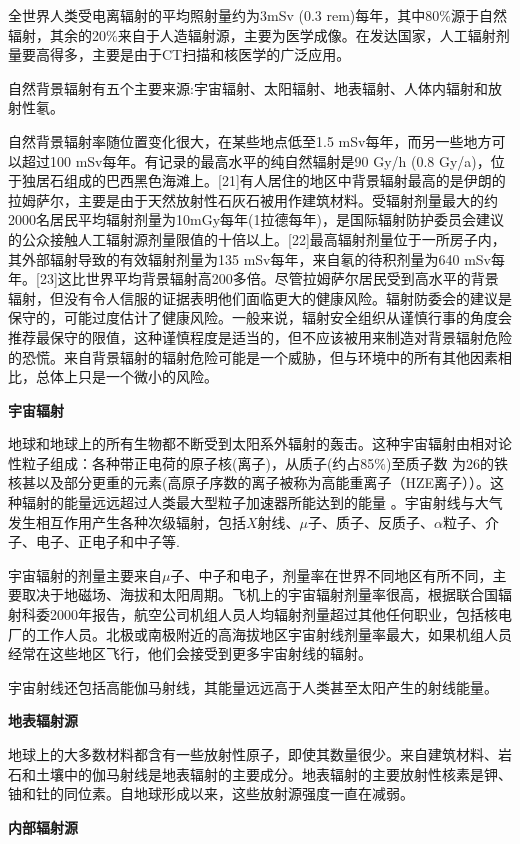 全世界人类受电离辐射的平均照射量约为3mSv (0.3 rem)每年，其中80\%源于自然辐射，其余的20\%来自于人造辐射源，主要为医学成像。在发达国家，人工辐射剂量要高得多，主要是由于CT扫描和核医学的广泛应用。

自然背景辐射有五个主要来源:宇宙辐射、太阳辐射、地表辐射、人体内辐射和放射性氡。

自然背景辐射率随位置变化很大，在某些地点低至1.5 mSv每年，而另一些地方可以超过100 mSv每年。有记录的最高水平的纯自然辐射是90 Gy/h (0.8 Gy/a)，位于独居石组成的巴西黑色海滩上。[21]有人居住的地区中背景辐射最高的是伊朗的拉姆萨尔，主要是由于天然放射性石灰石被用作建筑材料。受辐射剂量最大的约2000名居民平均辐射剂量为10mGy每年(1拉德每年)，是国际辐射防护委员会建议的公众接触人工辐射源剂量限值的十倍以上。[22]最高辐射剂量位于一所房子内，其外部辐射导致的有效辐射剂量为135 mSv每年，来自氡的待积剂量为640 mSv每年。[23]这比世界平均背景辐射高200多倍。尽管拉姆萨尔居民受到高水平的背景辐射，但没有令人信服的证据表明他们面临更大的健康风险。辐射防委会的建议是保守的，可能过度估计了健康风险。一般来说，辐射安全组织从谨慎行事的角度会推荐最保守的限值，这种谨慎程度是适当的，但不应该被用来制造对背景辐射危险的恐慌。来自背景辐射的辐射危险可能是一个威胁，但与环境中的所有其他因素相比，总体上只是一个微小的风险。

\textbf{宇宙辐射}

地球和地球上的所有生物都不断受到太阳系外辐射的轰击。这种宇宙辐射由相对论性粒子组成：各种带正电荷的原子核(离子)，从质子(约占85\%)至质子数 为26的铁核甚以及部分更重的元素(高原子序数的离子被称为高能重离子（HZE离子））。这种辐射的能量远远超过人类最大型粒子加速器所能达到的能量 。宇宙射线与大气发生相互作用产生各种次级辐射，包括$X$射线、$\mu$子、质子、反质子、$\alpha$粒子、介子、电子、正电子和中子等.

宇宙辐射的剂量主要来自$\mu$子、中子和电子，剂量率在世界不同地区有所不同，主要取决于地磁场、海拔和太阳周期。飞机上的宇宙辐射剂量率很高，根据联合国辐射科委2000年报告，航空公司机组人员人均辐射剂量超过其他任何职业，包括核电厂的工作人员。北极或南极附近的高海拔地区宇宙射线剂量率最大，如果机组人员经常在这些地区飞行，他们会接受到更多宇宙射线的辐射。

宇宙射线还包括高能伽马射线，其能量远远高于人类甚至太阳产生的射线能量。

\textbf{地表辐射源}

地球上的大多数材料都含有一些放射性原子，即使其数量很少。来自建筑材料、岩石和土壤中的伽马射线是地表辐射的主要成分。地表辐射的主要放射性核素是钾、铀和钍的同位素。自地球形成以来，这些放射源强度一直在减弱。

\textbf{内部辐射源}

